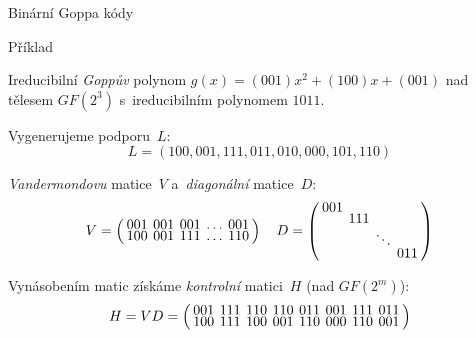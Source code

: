 \documentclass{beamer}
\begin{document}
\begin{frame}{Binární Goppa kódy}

    \begin{exampleblock}{Příklad}

        Ireducibilní \emph{Goppův} polynom $g(x) = (001)x^2 + (100)x + (001)$ nad
        tělesem $GF(2^3)$ s~ireducibilním polynomem $1011$.

        \pause
        Vygenerujeme podporu~$L$:
        $$
            L = \left(
                    100, 001, 111, 011, 010, 000, 101, 110
            \right)
        $$

        \pause
        \emph{Vandermondovu} matice~$V$ a~\emph{diagonální} matice~$D$:
        $$
            \arraycolsep=2pt
            \def\arraystretch{0.5}
            V = \left(
                \begin{array}{*{5}{c}}
                    001 & 001 & 001 & \ldots & 001 \\
                    100 & 001 & 111 & \ldots & 110 \\
                \end{array}
            \right)
            \quad
            D = \left(
                \begin{array}{*{4}{c}}
                    001 &     &     &     \\
                        & 111 &     &     \\
                        &     & \ddots &     \\
                        &     &     & 011 \\
                \end{array}
            \right)
        $$

        \pause
        Vynásobením matic získáme \emph{kontrolní} matici~$H$ (nad $GF(2^m)$):
        $$
            \arraycolsep=2pt
            \def\arraystretch{0.5}
            H = VD = \left(
                \begin{array}{*{8}{c}}
                    001 & 111 & 110 & 110 & 011 & 001 & 111 & 011 \\
                    100 & 111 & 100 & 001 & 110 & 000 & 110 & 001 \\
                \end{array}
            \right)
        $$

    \end{exampleblock}

\end{frame}
\end{document}
